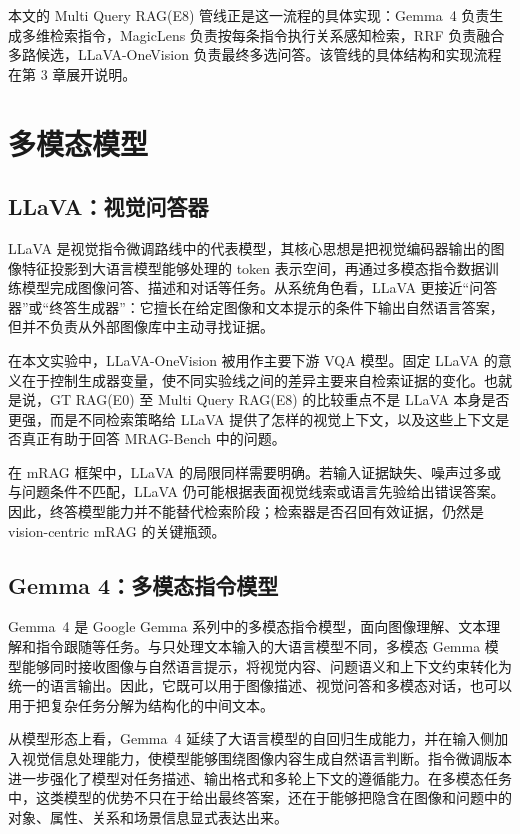 本文的 Multi Query RAG(E8) 管线正是这一流程的具体实现：Gemma~4 负责生成多维检索指令，MagicLens 负责按每条指令执行关系感知检索，RRF 负责融合多路候选，LLaVA-OneVision 负责最终多选问答。该管线的具体结构和实现流程在第 3 章展开说明。

\section{多模态模型}

\subsection{LLaVA：视觉问答器}

LLaVA 是视觉指令微调路线中的代表模型，其核心思想是把视觉编码器输出的图像特征投影到大语言模型能够处理的 token 表示空间，再通过多模态指令数据训练模型完成图像问答、描述和对话等任务\cite{liu2023llava}。从系统角色看，LLaVA 更接近“问答器”或“终答生成器”：它擅长在给定图像和文本提示的条件下输出自然语言答案，但并不负责从外部图像库中主动寻找证据。

在本文实验中，LLaVA-OneVision 被用作主要下游 VQA 模型。固定 LLaVA 的意义在于控制生成器变量，使不同实验线之间的差异主要来自检索证据的变化。也就是说，GT RAG(E0) 至 Multi Query RAG(E8) 的比较重点不是 LLaVA 本身是否更强，而是不同检索策略给 LLaVA 提供了怎样的视觉上下文，以及这些上下文是否真正有助于回答 MRAG-Bench 中的问题。

在 mRAG 框架中，LLaVA 的局限同样需要明确。若输入证据缺失、噪声过多或与问题条件不匹配，LLaVA 仍可能根据表面视觉线索或语言先验给出错误答案。因此，终答模型能力并不能替代检索阶段；检索器是否召回有效证据，仍然是 vision-centric mRAG 的关键瓶颈。

\subsection{Gemma 4：多模态指令模型}

Gemma~4 是 Google Gemma 系列中的多模态指令模型，面向图像理解、文本理解和指令跟随等任务。与只处理文本输入的大语言模型不同，多模态 Gemma 模型能够同时接收图像与自然语言提示，将视觉内容、问题语义和上下文约束转化为统一的语言输出。因此，它既可以用于图像描述、视觉问答和多模态对话，也可以用于把复杂任务分解为结构化的中间文本。

从模型形态上看，Gemma~4 延续了大语言模型的自回归生成能力，并在输入侧加入视觉信息处理能力，使模型能够围绕图像内容生成自然语言判断。指令微调版本进一步强化了模型对任务描述、输出格式和多轮上下文的遵循能力。在多模态任务中，这类模型的优势不只在于给出最终答案，还在于能够把隐含在图像和问题中的对象、属性、关系和场景信息显式表达出来。

